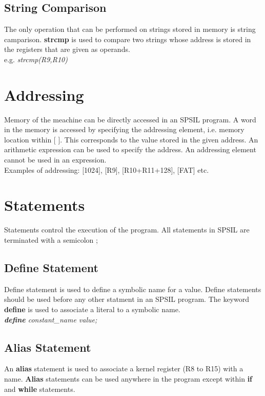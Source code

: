 \documentclass[11pt]{article}
\begin{document}
\subsection{String Comparison}
The only operation that can be performed on strings stored in memory is string camparison. \textbf{strcmp} is used to compare two strings whose address is stored in the registers that are given as operands. \\

 e.g. \textit{strcmp(R9,R10)}


\section{Addressing}
Memory of the meachine can be directly accessed in an SPSIL program. A word in the memory is accessed by specifying the addressing element, i.e. memory location within [ ]. This  corresponds to the value stored in the given address. An arithmetic expression can be used to specify the address. An addressing element cannot be used in an expression. \\

Examples of addressing: [1024], [R9], [R10+R11+128], [FAT] etc.

\section{Statements}

Statements control the execution of the program. All statements in SPSIL are terminated with a semicolon ;



\subsection{Define Statement}
Define statement is used to define a symbolic name for a value. Define statements should be  used before any other statment in an SPSIL program. The keyword \textbf{define} is used to associate a literal to a symbolic name. \\

\textit{ \textbf{define} constant\_name value; }


\subsection{Alias Statement}
An \textbf{alias} statement is used to  associate a kernel register (R8 to R15) with a name. \textbf{Alias} statements can be used anywhere in the program except within \textbf{if} and \textbf{while} statements.\\
\end{document}
